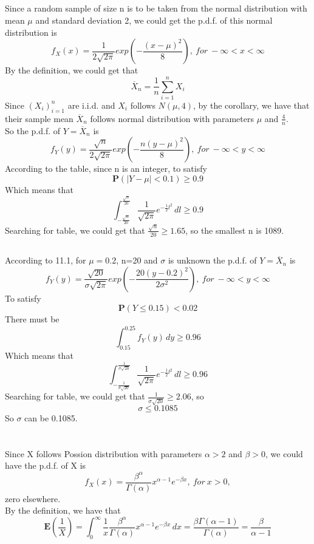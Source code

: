 \documentclass[10.5pt]{article}
\begin{document}
\subsection{}
Since a random sample of size n is to be taken from the normal distribution with mean $\mu$ and standard deviation 2, we could get the p.d.f. of this normal distribution is $$f_X(x)=\frac{1}{2\sqrt{2\pi}}exp\left(-\frac{(x-\mu)^2}{8}\right),~for ~-\infty<x<\infty$$\indent
By the definition, we could get that $$\overline{X}_n=\frac{1}{n}\sum_{i=1}^nX_i$$\indent
Since $(X_i)_{i=1}^n$ are i.i.d. and $X_i$ follows $N(\mu,4)$, by the corollary, we have that their sample mean $\overline{X}_n$ follows normal distribution with parameters $\mu$ and $\frac{4}{n}$.\\\indent
So the p.d.f. of $Y=\overline{X}_n$ is $$f_Y(y)=\frac{\sqrt{n}}{2\sqrt{2\pi}}exp\left(-\frac{n(y-\mu)^2}{8}\right),~for ~-\infty<y<\infty$$\indent
According to the table, since n is an integer, to satisfy $$\mathbf{P}(\left\rvert Y-\mu\right\rvert<0.1)\geqslant 0.9$$\indent
Which means that $$\int_{-\frac{\sqrt{n}}{20}}^{\frac{\sqrt{n}}{20}}\frac{1}{\sqrt{2\pi}}e^{-\frac{1}{2}l^2}\,dl\geqslant 0.9$$\indent
Searching for table, we could get that $\frac{\sqrt{n}}{20}\geqslant 1.65$, so the smallest n is 1089.
\subsection{}
According to 11.1, for $\mu=0.2$, n=20 and $\sigma$ is unknown the p.d.f. of $Y=\overline{X}_n$ is $$f_Y(y)=\frac{\sqrt{20}}{\sigma\sqrt{2\pi}}exp\left(-\frac{20(y-0.2)^2}{2\sigma^2}\right),~for ~-\infty<y<\infty$$\indent
To satisfy $$\mathbf{P}(Y\leqslant 0.15)<0.02$$\indent
There must be $$\int_{0.15}^{0.25}f_Y(y)\,dy\geqslant 0.96$$\indent
Which means that $$\int_{-\frac{1}{\sigma\sqrt{20}}}^{\frac{1}{\sigma\sqrt{20}}}\frac{1}{\sqrt{2\pi}}e^{-\frac{1}{2}l^2}\,dl\geqslant 0.96$$\indent
Searching for table, we could get that $\frac{1}{\sigma\sqrt{20}}\geqslant 2.06$, so $$\sigma\leqslant 0.1085$$\indent
So $\sigma$ can be 0.1085.

\section{}
\subsection{}
Since X follows Possion distribution with parameters $\alpha>2$ and $\beta>0$, we could have the p.d.f. of X is $$f_X(x)=\frac{\beta^\alpha}{\Gamma(\alpha)}x^{\alpha-1}e^{-\beta x},~for ~x>0,$$\indent
zero elsewhere.\\\indent
By the definition, we have that $$\mathbf{E}\left(\frac{1}{X}\right)=\int_0^{\infty}\frac{1}{x}\frac{\beta^\alpha}{\Gamma(\alpha)}x^{\alpha-1}e^{-\beta x}\,dx=\frac{\beta\Gamma(\alpha-1)}{\Gamma(\alpha)}=\frac{\beta}{\alpha-1}$$
\end{document}
